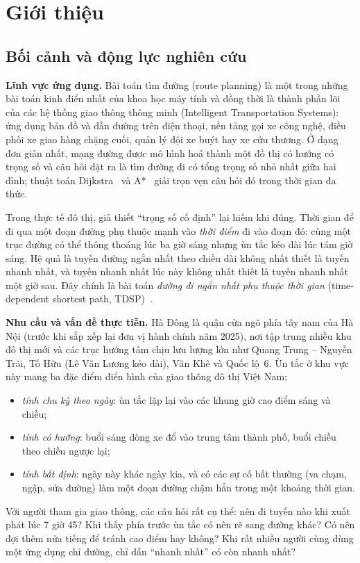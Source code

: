 \section{Giới thiệu}\label{sec:intro}

\subsection{Bối cảnh và động lực nghiên cứu}\label{sec:intro:context}

\textbf{Lĩnh vực ứng dụng.} Bài toán tìm đường (route planning) là một trong những bài toán kinh điển nhất của khoa học
máy tính và đồng thời là thành phần lõi của các hệ thống giao thông thông minh (Intelligent Transportation Systems):
ứng dụng bản đồ và dẫn đường trên điện thoại, nền tảng gọi xe công nghệ, điều phối xe giao hàng chặng cuối, quản lý
đội xe buýt hay xe cứu thương. Ở dạng đơn giản nhất, mạng đường được mô hình hoá thành một đồ thị có hướng có trọng
số và câu hỏi đặt ra là tìm đường đi có tổng trọng số nhỏ nhất giữa hai đỉnh; thuật toán Dijkstra~\cite{dijkstra1959}
và A*~\cite{hart1968} giải trọn vẹn câu hỏi đó trong thời gian đa thức.

Trong thực tế đô thị, giả thiết ``trọng số cố định'' lại hiếm khi đúng. Thời gian để đi qua một đoạn đường phụ thuộc
mạnh vào \emph{thời điểm} đi vào đoạn đó: cùng một trục đường có thể thông thoáng lúc ba giờ sáng nhưng ùn tắc kéo dài
lúc tám giờ sáng. Hệ quả là tuyến đường ngắn nhất theo chiều dài không nhất thiết là tuyến nhanh nhất, và tuyến nhanh
nhất lúc này không nhất thiết là tuyến nhanh nhất một giờ sau. Đây chính là bài toán \emph{đường đi ngắn nhất phụ thuộc
thời gian} (time-dependent shortest path, TDSP)~\cite{cooke1966,dreyfus1969,delling2009}.

\textbf{Nhu cầu và vấn đề thực tiễn.} Hà Đông là quận cửa ngõ phía tây nam của Hà Nội (trước khi sắp xếp lại đơn vị
hành chính năm 2025), nơi tập trung nhiều khu đô thị mới và các trục hướng tâm chịu lưu lượng lớn như Quang Trung --
Nguyễn Trãi, Tố Hữu (Lê Văn Lương kéo dài), Văn Khê và Quốc lộ~6. Ùn tắc ở khu vực này mang ba đặc điểm điển hình của
giao thông đô thị Việt Nam:
\begin{itemize}
    \item \emph{tính chu kỳ theo ngày}: ùn tắc lặp lại vào các khung giờ cao điểm sáng và chiều;
    \item \emph{tính có hướng}: buổi sáng dòng xe đổ vào trung tâm thành phố, buổi chiều theo chiều ngược lại;
    \item \emph{tính bất định}: ngày này khác ngày kia, và có các sự cố bất thường (va chạm, ngập, sửa đường) làm một
    đoạn đường chậm hẳn trong một khoảng thời gian.
\end{itemize}
Với người tham gia giao thông, các câu hỏi rất cụ thể: nên đi tuyến nào khi xuất phát lúc 7 giờ 45? Khi thấy phía trước
ùn tắc có nên rẽ sang đường khác? Có nên đợi thêm nửa tiếng để tránh cao điểm hay không? Khi rất nhiều người cùng dùng
một ứng dụng chỉ đường, chỉ dẫn ``nhanh nhất'' có còn nhanh nhất?

